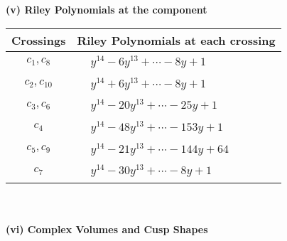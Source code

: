 \documentclass[1p]{elsarticle_modified}
\theoremstyle{definition}
\begin{document}
\newpage\renewcommand{\arraystretch}{1}
\flushleft \textbf{(v) Riley Polynomials at the component}\newline \\
\begin{tabular}{m{50pt}|m{274pt}}
Crossings & \hspace{64pt}Riley Polynomials at each crossing \\
\hline $$\begin{aligned}c_{1},c_{8}\end{aligned}$$&$\begin{aligned}
&y^{14}-6 y^{13}+\cdots-8 y+1
\end{aligned}$\\
\hline $$\begin{aligned}c_{2},c_{10}\end{aligned}$$&$\begin{aligned}
&y^{14}+6 y^{13}+\cdots-8 y+1
\end{aligned}$\\
\hline $$\begin{aligned}c_{3},c_{6}\end{aligned}$$&$\begin{aligned}
&y^{14}-20 y^{13}+\cdots-25 y+1
\end{aligned}$\\
\hline $$\begin{aligned}c_{4}\end{aligned}$$&$\begin{aligned}
&y^{14}-48 y^{13}+\cdots-153 y+1
\end{aligned}$\\
\hline $$\begin{aligned}c_{5},c_{9}\end{aligned}$$&$\begin{aligned}
&y^{14}-21 y^{13}+\cdots-144 y+64
\end{aligned}$\\
\hline $$\begin{aligned}c_{7}\end{aligned}$$&$\begin{aligned}
&y^{14}-30 y^{13}+\cdots-8 y+1
\end{aligned}$\\
\hline
\end{tabular}\\~\\
\newpage\flushleft \textbf{(vi) Complex Volumes and Cusp Shapes}
\end{document}
